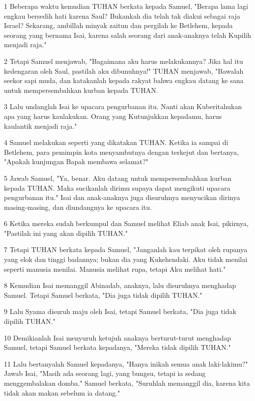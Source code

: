 \par 1 Beberapa waktu kemudian TUHAN berkata kepada Samuel, "Berapa lama lagi engkau bersedih hati karena Saul? Bukankah dia telah tak diakui sebagai raja Israel? Sekarang, ambillah minyak zaitun dan pergilah ke Betlehem, kepada seorang yang bernama Isai, karena salah seorang dari anak-anaknya telah Kupilih menjadi raja."
\par 2 Tetapi Samuel menjawab, "Bagaimana aku harus melakukannya? Jika hal itu kedengaran oleh Saul, pastilah aku dibunuhnya!" TUHAN menjawab, "Bawalah seekor sapi muda, dan katakanlah kepada rakyat bahwa engkau datang ke sana untuk mempersembahkan kurban kepada TUHAN.
\par 3 Lalu undanglah Isai ke upacara pengurbanan itu. Nanti akan Kuberitahukan apa yang harus kaulakukan. Orang yang Kutunjukkan kepadamu, harus kaulantik menjadi raja."
\par 4 Samuel melakukan seperti yang dikatakan TUHAN. Ketika ia sampai di Betlehem, para pemimpin kota menyambutnya dengan terkejut dan bertanya, "Apakah kunjungan Bapak membawa selamat?"
\par 5 Jawab Samuel, "Ya, benar. Aku datang untuk mempersembahkan kurban kepada TUHAN. Maka sucikanlah dirimu supaya dapat mengikuti upacara pengurbanan itu." Isai dan anak-anaknya juga disuruhnya menyucikan dirinya masing-masing, dan diundangnya ke upacara itu.
\par 6 Ketika mereka sudah berkumpul dan Samuel melihat Eliab anak Isai, pikirnya, "Pastilah ini yang akan dipilih TUHAN."
\par 7 Tetapi TUHAN berkata kepada Samuel, "Janganlah kau terpikat oleh rupanya yang elok dan tinggi badannya; bukan dia yang Kukehendaki. Aku tidak menilai seperti manusia menilai. Manusia melihat rupa, tetapi Aku melihat hati."
\par 8 Kemudian Isai memanggil Abinadab, anaknya, lalu disuruhnya menghadap Samuel. Tetapi Samuel berkata, "Dia juga tidak dipilih TUHAN."
\par 9 Lalu Syama disuruh maju oleh Isai, tetapi Samuel berkata, "Dia juga tidak dipilih TUHAN."
\par 10 Demikianlah Isai menyuruh ketujuh anaknya berturut-turut menghadap Samuel, tetapi Samuel berkata kepadanya, "Mereka tidak dipilih TUHAN."
\par 11 Lalu bertanyalah Samuel kepadanya, "Hanya inikah semua anak laki-lakimu?" Jawab Isai, "Masih ada seorang lagi, yang bungsu, tetapi ia sedang menggembalakan domba." Samuel berkata, "Suruhlah memanggil dia, karena kita tidak akan makan sebelum ia datang."
